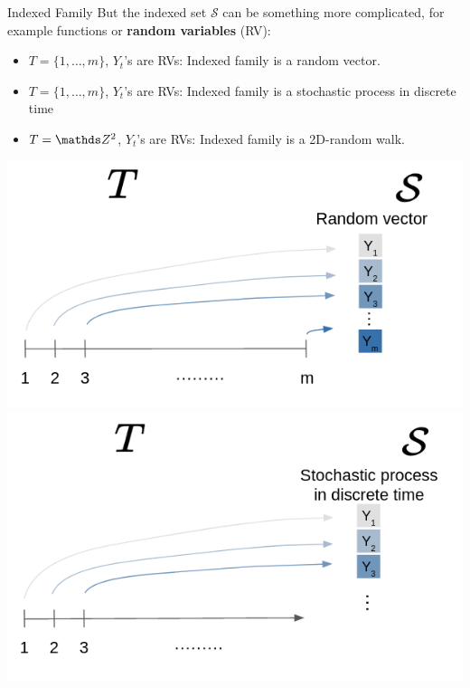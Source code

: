 \begin{vbframe}{Indexed Family}
But the indexed set $\mathcal{S}$ can be something more complicated, for example functions or \textbf{random variables} (RV):

\begin{minipage}{0.43\linewidth}
  \vspace*{0.5cm}
  \begin{itemize}
    \item $T = \{1, \dots, m\}$, $Y_t$'s are RVs: Indexed family is a random vector. \vspace*{0.2cm}
    \item $T = \{1, \dots, m\}$, $Y_t$'s are RVs: Indexed family is a stochastic process in discrete time \vspace*{0.2cm}
    \item $T = \Z^2$, $Y_t$'s are RVs: Indexed family is a 2D-random walk.
  \end{itemize}
\end{minipage}\hfill
\begin{minipage}{0.5\linewidth}
\includegraphics{figure_man/indexed_family/indexed_family_4.png} \\
\includegraphics{figure_man/indexed_family/indexed_family_3.png}
\end{minipage}

\end{vbframe}

